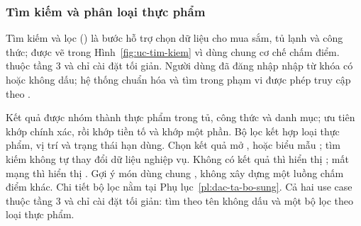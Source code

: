 \subsubsection{Tìm kiếm và phân loại thực phẩm}\label{sssec:pr-tim-kiem}

Tìm kiếm và lọc () là bước hỗ trợ chọn dữ liệu cho mua sắm, tủ lạnh và công thức;  được vẽ trong Hình~\ref{fig:uc-tim-kiem} vì dùng chung cơ chế chấm điểm.  thuộc tầng 3 và chỉ cài đặt tối giản. Người dùng đã đăng nhập nhập từ khóa có hoặc không dấu; hệ thống chuẩn hóa và tìm trong phạm vi được phép truy cập theo .


Kết quả được nhóm thành thực phẩm trong tủ, công thức và danh mục; ưu tiên khớp chính xác, rồi khớp tiền tố và khớp một phần. Bộ lọc kết hợp loại thực phẩm, vị trí và trạng thái hạn dùng. Chọn kết quả mở ,  hoặc biểu mẫu ; tìm kiếm không tự thay đổi dữ liệu nghiệp vụ. Không có kết quả thì hiển thị ; mất mạng thì hiển thị . Gợi ý món dùng chung , không xây dựng một luồng chấm điểm khác. Chi tiết bộ lọc nằm tại Phụ lục~\ref{pl:dac-ta-bo-sung}. Cả hai use case thuộc tầng 3 và chỉ cài đặt tối giản: tìm theo tên không dấu và một bộ lọc theo loại thực phẩm.
